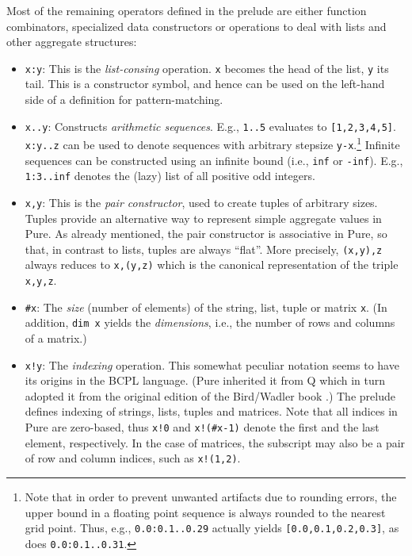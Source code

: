 \documentclass[a4paper,12pt]{article}
\begin{document}
Most of the remaining operators defined in the prelude are either function combinators, specialized data constructors or operations to deal with lists and other aggregate structures:

\begin{itemize}
\item \verb|x:y|: This is the \emph{list-consing} operation. \verb|x| becomes the head of the list, \verb|y| its tail. This is a constructor symbol, and hence can be used on the left-hand side of a definition for pattern-matching.

\item \verb|x..y|: Constructs \emph{arithmetic sequences}. E.g., \verb|1..5| evaluates to \verb|[1,2,3,4,5]|. \verb|x:y..z| can be used to denote sequences with arbitrary stepsize \verb|y-x|.\footnote{Note that in order to prevent unwanted artifacts due to rounding errors, the upper bound in a floating point sequence is always rounded to the nearest grid point. Thus, e.g., \texttt{0.0:0.1..0.29} actually yields \texttt{[0.0,0.1,0.2,0.3]}, as does \texttt{0.0:0.1..0.31}.} Infinite sequences can be constructed using an infinite bound (i.e., \verb|inf| or \verb|-inf|). E.g., \verb|1:3..inf| denotes the (lazy) list of all positive odd integers.

\item \verb|x,y|: This is the \emph{pair constructor}, used to create tuples of arbitrary sizes. Tuples provide an alternative way to represent simple aggregate values in Pure. As already mentioned, the pair constructor is associative in Pure, so that, in contrast to lists, tuples are always ``flat''. More precisely, \verb|(x,y),z| always reduces to \verb|x,(y,z)| which is the canonical representation of the triple \verb|x,y,z|.

\item \verb|#x|: The \emph{size} (number of elements) of the string, list, tuple or matrix \verb|x|. (In addition, \verb|dim x| yields the \emph{dimensions}, i.e., the number of rows and columns of a matrix.)

\item \verb|x!y|: The \emph{indexing} operation. This somewhat peculiar notation seems to have its origins in the BCPL language. (Pure inherited it from Q which in turn adopted it from the original edition of the Bird/Wadler book \cite{BiWa88}.) The prelude defines indexing of strings, lists, tuples and matrices. Note that all indices in Pure are zero-based, thus \verb|x!0| and \verb|x!(#x-1)| denote the first and the last element, respectively. In the case of matrices, the subscript may also be a pair of row and column indices, such as \verb|x!(1,2)|.


\end{itemize}
\end{document}
